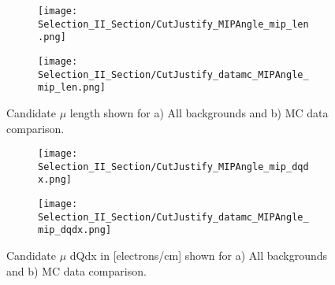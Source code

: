 \documentclass{article}
\begin{document}
\begin{figure}[h!]
\centering
  \begin{subfigure}[t]{0.3\textwidth}
    \centering
\texttt{[image: Selection\_II\_Section/CutJustify\_MIPAngle\_mip\_len.png]}
    \caption{ }
  \end{subfigure} 
  \hspace{20mm}
  \begin{subfigure}[t]{0.3\textwidth}
    \centering
\texttt{[image: Selection\_II\_Section/CutJustify\_datamc\_MIPAngle\_mip\_len.png]}
    \caption{ }
  \end{subfigure} 

\caption{ Candidate $\mu$ length shown for a) All backgrounds and b) MC data comparison. }
\label{fig:cutjust_sel2_multall_len}
\end{figure}


\begin{figure}[h!]
\centering
  \begin{subfigure}[t]{0.3\textwidth}
    \centering
\texttt{[image: Selection\_II\_Section/CutJustify\_MIPAngle\_mip\_dqdx.png]}
    \caption{ }
  \end{subfigure} 
  \hspace{20mm}
  \begin{subfigure}[t]{0.3\textwidth}
    \centering
\texttt{[image: Selection\_II\_Section/CutJustify\_datamc\_MIPAngle\_mip\_dqdx.png]}
    \caption{ }
  \end{subfigure} 
\caption{ Candidate $\mu$ dQdx in [electrons/cm] shown for a) All backgrounds and b) MC data comparison. }
\label{fig:cutjust_sel2_multall_dqdx}
\end{figure}
\end{document}
